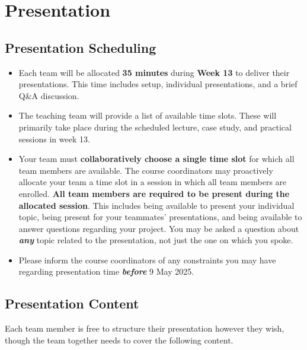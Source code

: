 \documentclass{csse4400}
\begin{document}
\section{Presentation}

\subsection{Presentation Scheduling}

\begin{itemize}[topsep=5pt,partopsep=1pt,itemsep=3pt,parsep=3pt]
  \item Each team will be allocated \textbf{35 minutes} during \textbf{Week 13} to deliver their presentations.
        This time includes setup, individual presentations, and a brief Q\&A discussion.
  \item The teaching team will provide a list of available time slots.
        These will primarily take place during the scheduled lecture, case study, and practical sessions in week 13.
  \item Your team must \textbf{collaboratively choose a single time slot} for which all team members are available.
        The course coordinators may proactively allocate your team a time slot in a session in which all team members are enrolled.        
        \textbf{All team members are required to be present during the allocated session}.
        This includes being available to present your individual topic,
        being present for your teammates' presentations,
        and being available to answer questions regarding your project.
        You may be asked a question about \textbf{\textit{any}} topic related to the presentation,
        not just the one on which you spoke.
  \item Please inform the course coordinators of any constraints you may have regarding presentation time
        \textbf{\textit{before}} 9 May 2025.
\end{itemize}

\subsection{Presentation Content}

Each team member is free to structure their presentation however they wish,
though the team together needs to cover the following content.
\end{document}

